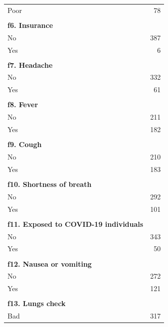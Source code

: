 \begin{longtable}{l r}
\hspace{1em} Poor & 78  \\
\\
\textbf{f6. Insurance} & \\
\hspace{1em} No  & 387 \\
\hspace{1em} Yes & 6   \\
\\
\textbf{f7. Headache} & \\
\hspace{1em} No  & 332 \\
\hspace{1em} Yes & 61  \\
\\
\textbf{f8. Fever} & \\
\hspace{1em} No  & 211 \\
\hspace{1em} Yes & 182 \\
\\
\textbf{f9. Cough} & \\
\hspace{1em} No  & 210 \\
\hspace{1em} Yes & 183 \\
\\
\textbf{f10. Shortness of breath} & \\
\hspace{1em} No  & 292 \\
\hspace{1em} Yes & 101 \\
\\
\textbf{f11. Exposed to COVID-19 individuals} & \\
\hspace{1em} No  & 343 \\
\hspace{1em} Yes & 50  \\
\\
\textbf{f12. Nausea or vomiting} & \\
\hspace{1em} No  & 272 \\
\hspace{1em} Yes & 121 \\
\\
\textbf{f13. Lungs check} & \\
\hspace{1em} Bad  & 317 \\

\end{longtable}
